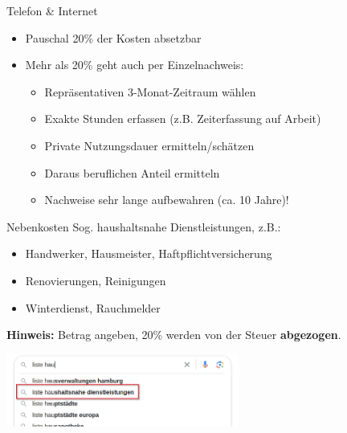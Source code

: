 \documentclass{beamer}
\begin{document}
			\begin{frame}{Telefon \& Internet}
				\begin{itemize}
					\item Pauschal 20\% der Kosten absetzbar
					\item Mehr als 20\% geht auch per Einzelnachweis:
					\begin{itemize}
						\item Repräsentativen 3-Monat-Zeitraum wählen
						\item Exakte Stunden erfassen (z.B. Zeiterfassung auf Arbeit)
						\item Private Nutzungsdauer ermitteln/schätzen
						\item Daraus beruflichen Anteil ermitteln
						\item Nachweise sehr lange aufbewahren (ca. 10 Jahre)!
					\end{itemize}
				\end{itemize}
			\end{frame}
		
			\begin{frame}{Nebenkosten}
				Sog. haushaltsnahe Dienstleistungen, z.B.:
				\begin{itemize}
					\item Handwerker, Hausmeister, Haftpflichtversicherung
					\item Renovierungen, Reinigungen
					\item Winterdienst, Rauchmelder
				\end{itemize}\n
				\textbf{Hinweis:} Betrag angeben, 20\% werden von der Steuer \textbf{abgezogen}.
				\pause
				\vspace{0.05cm}
				\begin{center}
					\includegraphics[height=2.4cm]{images/google-haushaltsnahe-dienstleistungen.png}
				\end{center}
			\end{frame}
		
\end{document}
